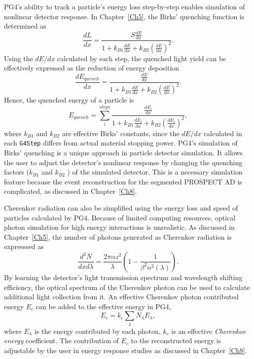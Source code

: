 PG4's ability to track a particle's energy loss step-by-step enables simulation of nonlinear detector response. 
In Chapter~\ref{Ch5}, the Birks' quenching function is determined as 
\begin{equation}
\frac{dL}{dx} = \frac{S\frac{dE}{dx}}{1+k_{B1}\frac{dE}{dx} + k_{B2}(\frac{dE}{dx})^2}.
\label{eq:birkslaw}
\end{equation}
Using the $dE/dx$ calculated by each step, the quenched light yield can be effectively expressed as the reduction of energy deposition 
\begin{equation}
   \frac{dE_{quench}}{dx} = \frac{\frac{dE}{dx}}{1+k_{B1}\frac{dE}{dx}+k_{B2}(\frac{dE}{dx})^2}.
\end{equation}
Hence, the quenched energy of a particle is
\begin{equation}
   E_{quench} = \sum_{i}^{steps}\frac{\frac{dE_i}{dx}}{1+k_{B1}\frac{dE_i}{dx}+k_{B2}(\frac{dE_i}{dx})^2}, 
   \label{eq:birksMC}
\end{equation}
where $k_{B1}$ and $k_{B2}$ are effective Birks' constants, since the $dE/dx$ calculated in each \texttt{G4Step} differs from actual material stopping power.
PG4's simulation of Birks' quenching is a unique approach in particle detector simulation.
It allows the user to adjust the detector's nonlinear response by changing the quenching factors ($k_{B1}$ and $k_{B2}$ ) of the simulated detector.
This is a necessary simulation feature because the event reconstruction for the segmented PROSPECT AD is complicated, as discussed in Chapter~\ref{Ch8}.

Cherenkov radiation can also be simplified using the energy loss and speed of particles calculated by PG4.
Because of limited computing resources, optical photon simulation for high energy interactions is unrealistic.
As discussed in Chapter~\ref{Ch5}, the number of photons generated as Cherenkov radiation is expresssed as 
\begin{equation}
    \frac{d^2N}{dxd\lambda} = \frac{2\pi\alpha z^2}{\lambda}\left(1- \frac{1}{\beta^2n^2(\lambda)}\right).
\end{equation}
By learning the detector's light transmission spectrum and wavelength shifting efficiency, the optical spectrum of the Cherenkov photon can be used to calculate additional light collection from it.
An effective Cherenkov photon contributed energy $E_c$ can be added to the effective energy in PG4,
\begin{equation}
E_{c} = k_{c}\sum_{\lambda}N_\lambda E_\lambda,
\end{equation}
where $E_\lambda$ is the energy contributed by each photon, $k_c$ is an effective \textit{Cherenkov energy} coefficient.
The contribution of $E_{c}$ to the reconstructed energy is adjustable by the user in energy response studies as discussed in Chapter~\ref{Ch8}.

